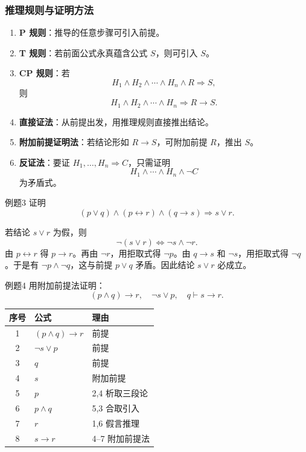 \subsubsection{推理规则与证明方法}

\begin{enumerate}
	\item \textbf{P 规则}：推导的任意步骤可引入前提。
	\item \textbf{T 规则}：若前面公式永真蕴含公式 \(S\)，则可引入 \(S\)。
	\item \textbf{CP 规则}：若
	\[
	H_1\land H_2\land\cdots\land H_n\land R\Rightarrow S,
	\]
	则
	\[
	H_1\land H_2\land\cdots\land H_n\Rightarrow R\to S.
	\]
	\item \textbf{直接证法}：从前提出发，用推理规则直接推出结论。
	\item \textbf{附加前提证明法}：若结论形如 \(R\to S\)，可附加前提 \(R\)，推出 \(S\)。
	\item \textbf{反证法}：要证 \(H_1,\dots,H_n\Rightarrow C\)，只需证明
	\[
	H_1\land\cdots\land H_n\land\neg C
	\]
	为矛盾式。
\end{enumerate}

\begin{question}{例题3}
	证明
	\[
	(p\lor q)\land(p\leftrightarrow r)\land(q\to s)\Rightarrow s\lor r.
	\]
	
	\begin{solution}
	若结论 \(s\lor r\) 为假，则
	\[
	\neg(s\lor r)\Leftrightarrow\neg s\land\neg r.
	\]
	由 \(p\leftrightarrow r\) 得 \(p\to r\)。再由 \(\neg r\)，用拒取式得 \(\neg p\)。由 \(q\to s\) 和 \(\neg s\)，用拒取式得 \(\neg q\)。于是有 \(\neg p\land\neg q\)，这与前提 \(p\lor q\) 矛盾。因此结论 \(s\lor r\) 必成立。
	\end{solution}
\end{question}

\begin{question}{例题4}
	用附加前提法证明：
	\[
	(p\land q)\to r,\quad \neg s\lor p,\quad q\vdash s\to r.
	\]
	
	\begin{solution}
	\begin{center}
	\begin{tabular}{cll}
		\toprule
		序号 & 公式 & 理由\\
		\midrule
		1&\((p\land q)\to r\)&前提\\
		2&\(\neg s\lor p\)&前提\\
		3&\(q\)&前提\\
		4&\(s\)&附加前提\\
		5&\(p\)&2,4 析取三段论\\
		6&\(p\land q\)&5,3 合取引入\\
		7&\(r\)&1,6 假言推理\\
		8&\(s\to r\)&4--7 附加前提法\\
		\bottomrule
	\end{tabular}
	\end{center}
	\end{solution}
\end{question}

